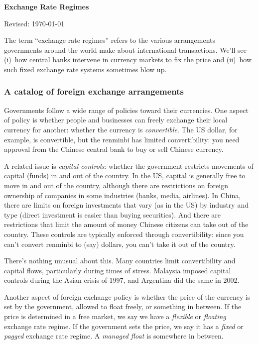 \documentclass[letterpaper,12pt]{article}
\def\HeadName{Exchange Rate Regimes}
\begin{document}
\thispagestyle{empty}%
\Head

\centerline{\large \bf \HeadName}%
\centerline{Revised: \today}

\bigskip
The term ``exchange rate regimes'' refers to the various
arrangements governments around the world make about
international transactions.
We'll see (i)~how central banks intervene
in currency markets to fix the price
and (ii)~how such fixed exchange rate systems sometimes
blow up.


\subsubsection*{A catalog of foreign exchange arrangements}

Governments follow a wide range of policies toward their currencies.
One aspect of policy is whether people and businesses can freely
exchange their local currency for another:
whether the currency is {\it convertible\/}.
The US dollar, for example, is convertible,
but the renminbi has limited convertibility:
you need approval from the Chinese central
bank to buy or sell Chinese currency.

A related issue is {\it capital controls\/}:
whether the government restricts movements of capital (funds)
in and out of the country.
In the US, capital is generally free to move in and out of the country,
although there are restrictions on foreign ownership of companies
in some industries (banks, media, airlines).
In China, there are limits on foreign investments that vary (as in the US)
by industry and type (direct investment is easier than buying securities).
And there are restrictions that limit the amount of money
Chinese citizens can take out of the country.
These controls are typically enforced through convertibility:
since you can't convert renminbi to (say) dollars, you can't
take it out of the country.


There's nothing unusual about this.
Many countries limit convertibility and capital flows,
particularly during times of stress.
Malaysia imposed capital controls during the Asian crisis of 1997,
and Argentina did the same in 2002.

Another aspect of foreign exchange policy
is whether the price of the currency is set by the government,
allowed to float freely, or something in between.
If the price is determined in a free market, we say we have a
{\it flexible\/} or {\it floating\/} exchange rate regime.
If the government sets the price, we say it has a
{\it fixed\/} or {\it pagged\/} exchange rate regime.
A {\it managed float\/} is somewhere in between.
\end{document}
